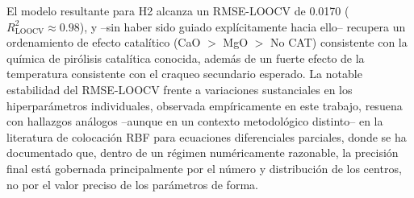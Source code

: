 \documentclass[11pt,a4paper]{article}
\begin{document}
El modelo resultante para H2 alcanza un RMSE-LOOCV de 0.0170
($R^2_{\text{LOOCV}}\approx0.98$), y --sin haber sido guiado expl\'icitamente
hacia ello-- recupera un ordenamiento de efecto catal\'itico (CaO $>$ MgO
$>$ No CAT) consistente con la qu\'imica de pir\'olisis catal\'itica conocida,
adem\'as de un fuerte efecto de la temperatura consistente con el craqueo
secundario esperado. La notable estabilidad del RMSE-LOOCV frente a
variaciones sustanciales en los hiperpar\'ametros individuales, observada
emp\'iricamente en este trabajo, resuena con hallazgos an\'alogos --aunque en
un contexto metodol\'ogico distinto-- en la literatura de colocaci\'on RBF
para ecuaciones diferenciales parciales, donde se ha documentado que, dentro
de un r\'egimen num\'ericamente razonable, la precisi\'on final est\'a
gobernada principalmente por el n\'umero y distribuci\'on de los centros, no
por el valor preciso de los par\'ametros de forma.
\end{document}
